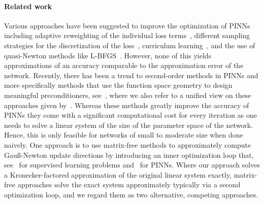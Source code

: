 \paragraph{Related work}
Various approaches have been suggested to improve the optimization of PINNs including adaptive reweighting of the individual loss terms~\citep{wang2021understanding,van2022optimally,wang2022and}, different sampling strategies for the discretization of the loss~\citep{lu2021deepxde, nabian2021efficient, daw2022rethinking,zapf2022investigating, wang2022respecting, wu2023comprehensive}, curriculum learning~\citep{krishnapriyan2021characterizing, wang2022respecting}, and the use of quasi-Newton methods like L-BFGS~\citep{markidis2021old}. 
However, none of this yields approximations of an accuracy comparable to the approximation error of the network. 
Recently, there has been a trend to second-order methods in PINNs and more specifically methods that use the function space geometry to design meaningful preconditioners, see~\cite{zeng2022competitive, muller2023achieving, de2023operator, liu2024preconditioning, jnini2024gauss,chen2024teng, zampini2024petscml}, where we also refer to a unified view on these approaches given by~\cite{muller2024optimization}. 
Whereas these methods greatly improve the accuracy of PINNs they come with a significant computational cost for every iteration as one needs to solve a linear system of the size of the parameter space of the network. 
Hence, this is only feasible for networks of small to moderate size when done naively. 
One approach is to use matrix-free methods to approximately compute Gauß-Newton update directions by introducing an inner optimization loop that, see~\cite{schraudolph2002fast,martens2010deep} for supervised learning problems and~\cite{zeng2022competitive,bonfanti2024challenges, jnini2024gauss,zampini2024petscml} for PINNs.  
Where our approach solves a Kronecker-factored approximation of the original linear system exactly, matrix-free approaches solve the exact system approximately typically via a second optimization loop, and we regard them as two alternative, competing approaches. %

